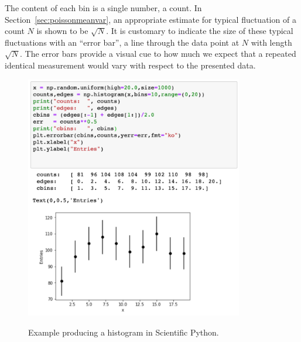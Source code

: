 \documentclass[12pt,oneside]{book}
\begin{document}
The content of each bin is a single number, a count. In
Section~\ref{sec:poissonmeanvar}, an appropriate estimate for typical
fluctuation of a count $N$ is shown to be $\sqrt{N}$.  It is customary
to indicate the size of these typical fluctuations with an ``error
bar'', a line through the data point at $N$ with length $\sqrt{N}$.
The error bars provide a visual cue to how much we expect that a
repeated identical measurement would vary with respect to the
presented data.

\begin{figure}[htbp]
\begin{center}
{\includegraphics[width=0.85\textwidth]{figs/makehisteg.png}} 
\end{center}
\caption{\label{fig:makehisteg} Example producing a histogram in Scientific Python.}
\end{figure}
\end{document}
